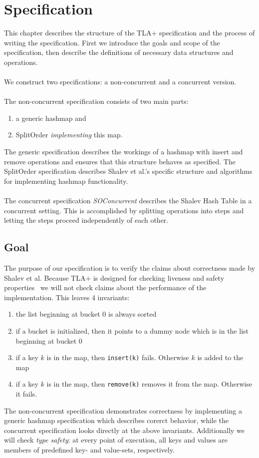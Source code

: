 \documentclass{uit-thesis}
\begin{document}
\chapter{Specification}\label{ch:specification}
This chapter describes the structure of the TLA+ specification and the process of writing the specification. First we introduce the goals and scope of the specification, then describe the definitions of necessary data structures and operations.
\\\\
We construct two specifications: a non-concurrent and a concurrent version.
\\\\
The non-concurrent specification consists of two main parts:
\begin{enumerate}
    \item a generic hashmap and
    \item SplitOrder \emph{implementing} this map.
\end{enumerate}
The generic specification describes the workings of a hashmap with insert and remove operations and ensures that this structure behaves as specified. The SplitOrder specification describes Shalev et al.'s specific structure and algorithms for implementing hashmap functionality.
\\\\
The concurrent specification \textit{SOConcurrent} describes the Shalev Hash Table in a concurrent setting. This is accomplished by splitting operations into steps and letting the steps proceed independently of each other.

\section{Goal}\label{sec:spec-goals}
The purpose of our specification is to verify the claims about correctness made by Shalev et al. Because TLA+ is designed for checking liveness and safety properties~\cite{Lund2019} we will not check claims about the performance of the implementation. This leaves 4 invariants:
\begin{enumerate}
    \item the list beginning at bucket 0 is always sorted
    \item if a bucket is initialized, then it points to a dummy node which is in the list beginning at bucket 0
    \item if a key $k$ is in the map, then \texttt{insert(k)} fails. Otherwise $k$ is added to the map
    \item if a key $k$ is in the map, then \texttt{remove(k)} removes it from the map. Otherwise it fails.
\end{enumerate}
The non-concurrent specification demonstrates correctness by implementing a generic hashmap specification which describes corerct behavior, while the concurrent specification looks directly at the above invariants.
Additionally we will check \textit{type safety}: at every point of execution, all keys and values are members of predefined key- and value-sets, respectively.
\end{document}
